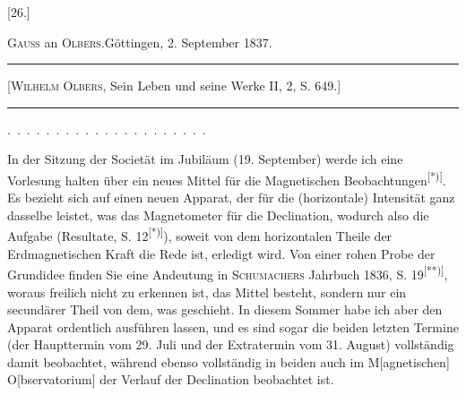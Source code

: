 \clearpage\begingroup{}

\begin{center}[26.]\end{center}
\begin{center}\textsc{Gauss} an \textsc{Olbers}.\quad Göttingen, 2. September 1837.\end{center}
\begin{center}\begin{minipage}{.88\linewidth}\centering\hrule\vspace{3pt}
\small [\textsc{Wilhelm Olbers}, Sein Leben und seine Werke II, 2, S. 649.]
\par\vspace{3pt}\hrule\end{minipage}\end{center}
\noindent .\ .\ .\ .\ .\ .\ .\ .\ .\ .\ .\ .\ .\ .\ .\ .\ .\ .\ .\ .\ .\par
\indent In der Sitzung der Societät im Jubiläum (19. September) werde ich eine
Vorlesung halten über ein neues Mittel für die Magnetischen Beobachtungen\textsuperscript{[*)]}.
Es bezieht sich auf einen neuen Apparat, der für die (horizontale) Intensität
\begingroup\renewcommand{\thefootnote}{}\endgroup
\clearpage{}
\noindent ganz dasselbe leistet, was das Magnetometer für die Declination, wodurch
also die Aufgabe (Resultate, S. 12\textsuperscript{[*)]}), soweit von dem horizontalen Theile der
Erdmagnetischen Kraft die Rede ist, erledigt wird. Von einer rohen Probe
der Grundidee finden Sie eine Andeutung in \textsc{Schumachers} Jahrbuch 1836,
S. 19\textsuperscript{[**)]}, woraus freilich nicht zu erkennen ist,  das Mittel besteht,
sondern nur ein secundärer Theil von dem, was  geschieht. In diesem
Sommer habe ich aber den Apparat ordentlich ausführen lassen, und es sind
sogar die beiden letzten Termine (der Haupttermin vom 29. Juli und der
Extratermin vom 31. August) vollständig damit beobachtet, während ebenso
vollständig in beiden auch im M[agnetischen] O[bservatorium] der Verlauf
der Declination beobachtet ist.
\begingroup\renewcommand{\thefootnote}{}
\endgroup

